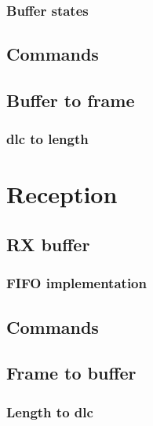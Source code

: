 \documentclass{ctuthesis}
\begin{document}
  \subsubsection{Buffer states}
 
 \subsection{Commands}
 
 \subsection{Buffer to frame}
 
  \subsubsection{dlc to length}
 
 \section{Reception}

 \subsection{RX buffer}
 
  \subsubsection{FIFO implementation}
 
 \subsection{Commands}
 
 \subsection{Frame to buffer}
 
  \subsubsection{Length to dlc}
 
\end{document}
